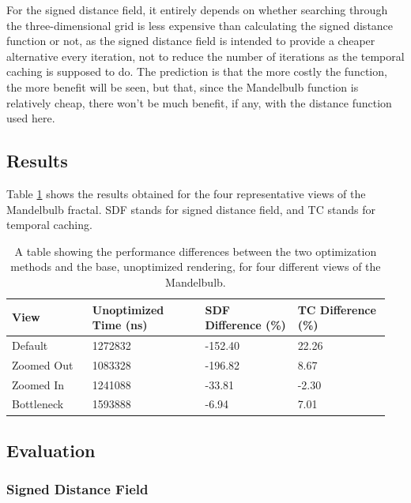 For the signed distance field, it entirely depends on whether searching through the three-dimensional grid is less expensive than calculating the signed distance function or not, as the signed distance field is intended to provide a cheaper alternative every iteration, not to reduce the number of iterations as the temporal caching is supposed to do. The prediction is that the more costly the function, the more benefit will be seen, but that, since the Mandelbulb function is relatively cheap, there won't be much benefit, if any, with the distance function used here.

\subsection{Results}

Table \ref{table:mandelbulb-static-results} shows the results obtained for the four representative views of the Mandelbulb fractal. SDF stands for signed distance field, and TC stands for temporal caching.

\begin{table}[ht]
	\centering
	\begin{tabular}{||p{0.2\linewidth}|p{0.29\linewidth}|p{0.23\linewidth}|p{0.23\linewidth}||}
		\hline
		View & Unoptimized Time (ns) & SDF Difference (\%) & TC Difference (\%)\\
		\hline\hline
		Default & 1272832 & -152.40 & 22.26\\
		\hline
		Zoomed Out &1083328  & -196.82 & 8.67\\
		\hline
		Zoomed In & 1241088 & -33.81 & -2.30\\
		\hline
		Bottleneck & 1593888 & -6.94 & 7.01\\
		\hline
	\end{tabular}
	\caption{A table showing the performance differences between the two optimization methods and the base, unoptimized rendering, for four different views of the Mandelbulb.}
	\label{table:mandelbulb-static-results}
\end{table}

\subsection{Evaluation}

\subsubsection{Signed Distance Field}

